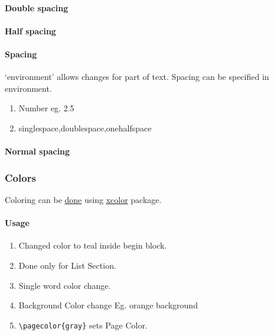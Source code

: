 \documentclass{report}[a4paper,12pt] %
\begin{document}
\paragraph{Double spacing}
\doublespacing
\lipsum[1]

\paragraph{Half spacing}
\onehalfspacing
\lipsum[1]

\begin{spacing}{2.5}
\paragraph{Spacing} `environment' allows changes for part of text.
Spacing can be specified in environment.
\begin{enumerate}
  \item Number eg. 2.5
  \item singlespace,doublespace,onehalfspace
\end{enumerate}

\lipsum[1]
\end{spacing}

\paragraph{Normal spacing}
\lipsum[1]

\subsubsection{Colors}
Coloring can be \href{https://www.overleaf.com/learn/latex/Using_colours_in_LaTeX}{done} using \href{https://mirrors.sjtug.sjtu.edu.cn/ctan/macros/latex/contrib/xcolor/xcolor.pdf}{xcolor} package.

\paragraph{Usage}
\begin{enumerate}
  \color{teal}
  \item Changed color to teal inside begin block.
  \item Done only for List Section.
  \item Single \textcolor{Sepia}{word} color change.
  \item Background Color change Eg. \colorbox{BurntOrange}{orange background}
  \item \verb|\pagecolor{gray}| sets Page Color.
\end{enumerate}
\end{document}
